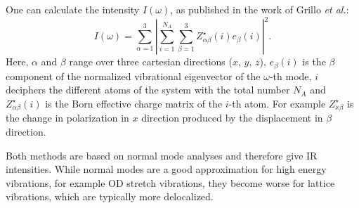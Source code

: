 \documentclass[11pt,DIV=13,BCOR=5mm,a4paper,headinclude]{scrbook}
\begin{document}
\begin{itemize}
One can calculate the intensity $I(\omega)$\cite{Bruesch1986,Baroni2001}, as published in the work of Grillo \textit{et al.}\cite{BEC}:
\begin{equation}\label{eq:bec}
  I(\omega) = \sum_{\alpha=1}^3|\sum_{i=1}^{N_A}\sum_{\beta=1}^3 Z_{\alpha\beta}^\star(i)e_\beta(i)|^2.
\end{equation}
Here, $\alpha$ and $\beta$ range over three cartesian directions ($x$, $y$, $z$), $e_\beta(i)$ is the $\beta$ component of the normalized vibrational eigenvector of the $\omega$-th mode, $i$ deciphers the different atoms of the system with the total number $N_A$ and $Z_{\alpha\beta}^\star(i)$ is the Born effective charge matrix of the $i$-th atom.
For example $Z_{x\beta}^\star$ is the change in polarization in $x$ direction produced by the displacement in $\beta$ direction.
\\
\end{itemize}
Both methods are based on normal mode analyses and therefore give IR intensities.
While normal modes are a good approximation for high energy vibrations, for example OD stretch vibrations, they become worse for lattice vibrations, which are typically more delocalized.
\end{document}
